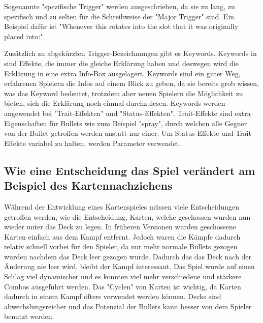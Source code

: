 Sogenannte "spezifische Trigger" werden ausgeschrieben, da sie zu lang, zu spezifisch und zu selten für die Schreibweise der "Major Trigger" sind. Ein Beispiel dafür ist
"Whenever this rotates into the slot that it was originally placed into:".


Zusätzlich zu abgekürzten Trigger-Bezeichnungen gibt es Keywords. Keywords in \FF sind Effekte, die immer die gleiche
Erklärung haben und deswegen wird die Erklärung in eine extra Info-Box ausgelagert. %
Keywords sind ein guter Weg, erfahrenen Spielern die Infos auf einem Blick zu geben, da sie bereits grob wissen, was das
Keyword bedeutet, trotzdem aber neuen Spielern die Möglichkeit zu bieten, sich die Erklärung noch einmal durchzulesen.
Keywords werden angewendet bei "Trait-Effekten" und "Status-Effekten". Trait-Effekte sind extra Eigenschaften für Bullets
wie zum Beispiel "spray", durch welchen alle Gegner von der Bullet getroffen werden anstatt nur einer.
Um Status-Effekte und Trait-Effekte variabel zu halten, werden Parameter verwendet. %








%


\subsection{Wie eine Entscheidung das Spiel verändert am Beispiel des Kartennachziehens}\label{subsec:placementMatters}

Während der Entwicklung eines Kartenspieles müssen viele Entscheidungen getroffen werden, wie \zB die Entscheidung,
Karten, welche geschossen wurden nun wieder unter das Deck zu legen. In früheren \FF Versionen wurden geschossene Karten einfach aus dem Kampf entfernt.
Jedoch waren die Kämpfe dadurch relativ schnell vorbei für den Spieler, da nur mehr normale Bullets gezogen wurden nachdem das Deck leer gezogen wurde.
Dadurch das das Deck nach der Änderung nie leer wird, bleibt der Kampf interessant.
Das Spiel wurde auf einen Schlag viel dynamischer und es konnten viel mehr verschiedene und stärkere Combos ausgeführt werden. Das "Cyclen"
von Karten ist wichtig, da Karten dadurch in einem Kampf öfters verwendet werden können. Decks sind abwechslungsreicher und das Potenzial der Bullets
kann besser von dem Spieler benutzt werden.



